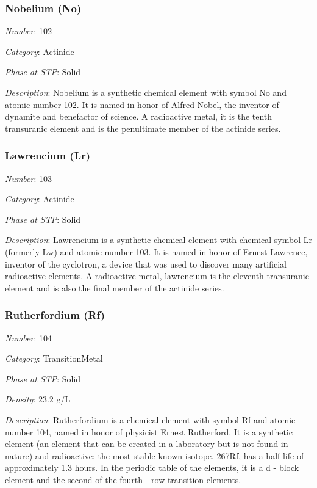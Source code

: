 \documentclass{article}
\begin{document}
\hypertarget{subsubsection::No}{}\subsubsection{Nobelium (No)}

\textit{Number}: 102

\textit{Category}: Actinide

\textit{Phase at STP}: Solid

\textit{Description}: Nobelium is a synthetic chemical element with symbol No and atomic number 102. It is named in honor of Alfred Nobel, the inventor of dynamite and benefactor of science. A radioactive metal, it is the tenth transuranic element and is the penultimate member of the actinide series.

\hypertarget{subsubsection::Lr}{}\subsubsection{Lawrencium (Lr)}

\textit{Number}: 103

\textit{Category}: Actinide

\textit{Phase at STP}: Solid

\textit{Description}: Lawrencium is a synthetic chemical element with chemical symbol Lr (formerly Lw) and atomic number 103. It is named in honor of Ernest Lawrence, inventor of the cyclotron, a device that was used to discover many artificial radioactive elements. A radioactive metal, lawrencium is the eleventh transuranic element and is also the final member of the actinide series.

\hypertarget{subsubsection::Rf}{}\subsubsection{Rutherfordium (Rf)}

\textit{Number}: 104

\textit{Category}: TransitionMetal

\textit{Phase at STP}: Solid

\textit{Density}: 23.2 g/L

\textit{Description}: Rutherfordium is a chemical element with symbol Rf and atomic number 104, named in honor of physicist Ernest Rutherford. It is a synthetic element (an element that can be created in a laboratory but is not found in nature) and radioactive; the most stable known isotope, 267Rf, has a half-life of approximately 1.3 hours. In the periodic table of the elements, it is a d - block element and the second of the fourth - row transition elements.
\end{document}
